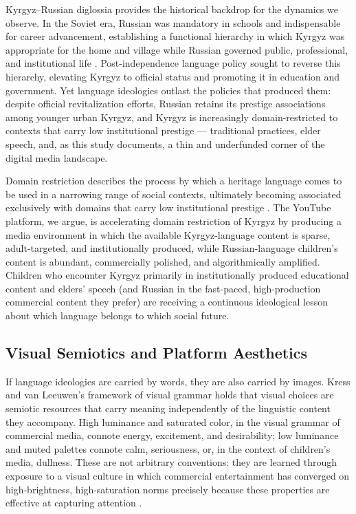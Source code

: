 \documentclass[12pt, letterpaper]{article}
\begin{document}
Kyrgyz--Russian diglossia provides the historical backdrop for the dynamics we observe.
In the Soviet era, Russian was mandatory in schools and indispensable for career advancement,
establishing a functional hierarchy in which Kyrgyz was appropriate for the home and village
while Russian governed public, professional, and institutional life \citep{escher2026empire}.
Post-independence language policy sought to reverse this hierarchy, elevating Kyrgyz to
official status and promoting it in education and government. Yet language ideologies outlast
the policies that produced them: despite official revitalization efforts, Russian retains its
prestige associations among younger urban Kyrgyz, and Kyrgyz is increasingly domain-restricted
to contexts that carry low institutional prestige --- traditional practices, elder speech, and,
as this study documents, a thin and underfunded corner of the digital media landscape.

Domain restriction describes the process by which a heritage language comes to be used in a
narrowing range of social contexts, ultimately becoming associated exclusively with domains
that carry low institutional prestige \citep{woolard1998}. The YouTube platform, we argue,
is accelerating domain restriction of Kyrgyz by producing a media environment in which the
available Kyrgyz-language content is sparse, adult-targeted, and institutionally produced,
while Russian-language children's content is abundant, commercially polished, and
algorithmically amplified. Children who encounter Kyrgyz primarily in institutionally produced
educational content and elders' speech (and Russian in the fast-paced, high-production
commercial content they prefer) are receiving a continuous ideological lesson about which
language belongs to which social future.

\subsection{Visual Semiotics and Platform Aesthetics}

If language ideologies are carried by words, they are also carried by images. Kress and van
Leeuwen's framework of visual grammar \citep{kress_vanleeuwen1996} holds that visual choices are semiotic resources that carry meaning
independently of the linguistic content they accompany. High luminance and saturated color,
in the visual grammar of commercial media, connote energy, excitement, and desirability;
low luminance and muted palettes connote calm, seriousness, or, in the context of children's
media, dullness. These are not arbitrary conventions: they are learned through exposure to a
visual culture in which commercial entertainment has converged on high-brightness,
high-saturation norms precisely because these properties are effective at capturing
attention \citep{labrecque2012}.
\end{document}
